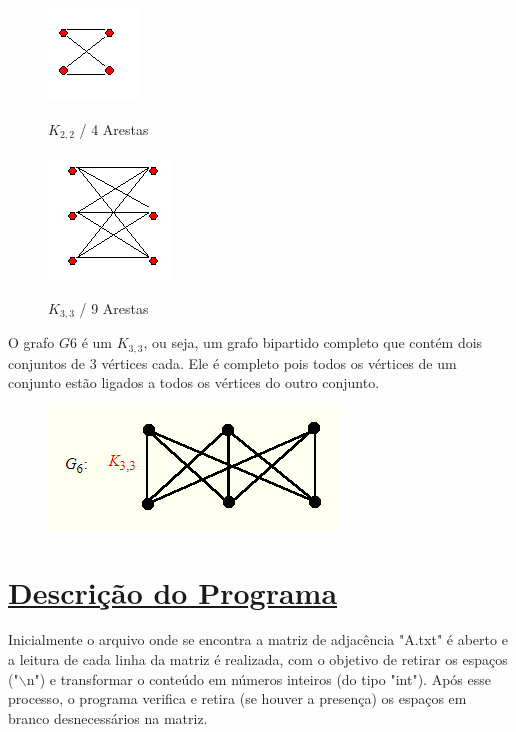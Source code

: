 \documentclass{article}
\begin{document}
\begin{figure}[H]
	\centering
	\includegraphics[width=0.2\linewidth]{"Figuras/img3"}
	\label{fig:img3}
	\caption{$ K_{2,2} $ / 4 Arestas}
\end{figure}\vspace*{0.3cm}
\begin{figure}[H]
	\centering
	\includegraphics[width=0.2\linewidth]{"Figuras/img4"}
	\label{fig:img4}
	\caption{$ K_{3,3} $ / 9 Arestas}
\end{figure}\vspace*{0.3cm}
	
	O grafo $G6$ é um $ K_{3,3} $, ou seja, um grafo bipartido completo que contém dois conjuntos de 3 vértices cada. Ele é completo pois todos os vértices de um conjunto estão ligados a todos os vértices do outro conjunto.

\begin{figure}[H]
	\centering
	\includegraphics[width=0.5\linewidth]{"Figuras/img5"}
	\label{fig:img5}
	\caption{}
\end{figure}\vspace*{0.2cm}

	\section{{\Large \underline{Descrição do Programa}}}\vspace*{0.3cm}
	
	Inicialmente o arquivo onde se encontra a matriz de adjacência "A.txt" é aberto e a leitura de cada linha da matriz é realizada, com o objetivo de retirar os espaços ("$\backslash$n") e transformar o conteúdo em números inteiros (do tipo "int"). Após esse processo, o programa verifica e retira (se houver a presença) os espaços em branco desnecessários na matriz.
	
\end{document}
